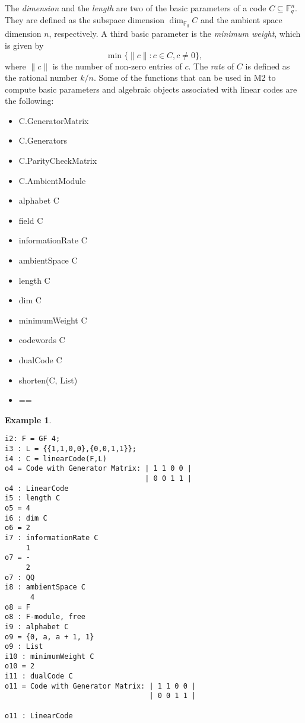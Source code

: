 \documentclass[12pt]{amsart}
\theoremstyle{plain}
\newtheorem{example}[theorem]{Example}
\begin{document}
The {\it dimension\/} and the {\it length\/} are two of the basic parameters of a code $C\subseteq \mathbb{F}_q^n$. They are defined as the subspace dimension $\dim_{\mathbb{F}_q} C$ and the ambient space dimension $n$, respectively. A third basic parameter is the {\it minimum weight}, which is given by 
\[
\min\{\|c\|
\colon  c \in C, c \neq 0\},
\]
where $\| c \|$ is the number of non-zero entries of $c$. The {\it rate} of $C$ is defined as the rational number $k/n.$ %
 Some of the functions that can be used in M2 to compute basic parameters and algebraic objects associated with linear codes are the following: \newline
\begin{minipage}[t]{0.33\textwidth}
\begin{itemize}[leftmargin=1 cm]
\item C.GeneratorMatrix
\item C.Generators
\item C.ParityCheckMatrix
\item C.AmbientModule
\item alphabet C
\end{itemize}
\end{minipage}
\begin{minipage}[t]{0.33\textwidth}
\begin{itemize}
\item field C
\item informationRate C
\item ambientSpace C
\item length C
\item dim C
\end{itemize}
\end{minipage}
\begin{minipage}[t]{0.33\textwidth}
\begin{itemize}
\item minimumWeight C
\item codewords C
\item dualCode C
\item shorten(C, List)
\item ==
\end{itemize}
\end{minipage}

\begin{example}
$\,$
\begin{verbatim}
i2: F = GF 4;
i3 : L = {{1,1,0,0},{0,0,1,1}};
i4 : C = linearCode(F,L)
o4 = Code with Generator Matrix: | 1 1 0 0 |
                                 | 0 0 1 1 |
o4 : LinearCode
i5 : length C
o5 = 4
i6 : dim C
o6 = 2
i7 : informationRate C
     1
o7 = -
     2
o7 : QQ
i8 : ambientSpace C
      4
o8 = F
o8 : F-module, free
i9 : alphabet C
o9 = {0, a, a + 1, 1}
o9 : List
i10 : minimumWeight C
o10 = 2
i11 : dualCode C
o11 = Code with Generator Matrix: | 1 1 0 0 |
                                  | 0 0 1 1 |

o11 : LinearCode
\end{verbatim}
\end{example}
\end{document}
